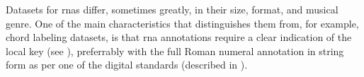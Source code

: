 
Datasets for \glspl{rna} differ, sometimes greatly, in their
size, format, and musical genre. One of the main
characteristics that distinguishes them from, for example,
chord labeling datasets, is that \gls{rna} annotations
require a clear indication of the local key (see
), preferrably with the full Roman
numeral annotation in string form as per one of the digital
standards (described in ).
